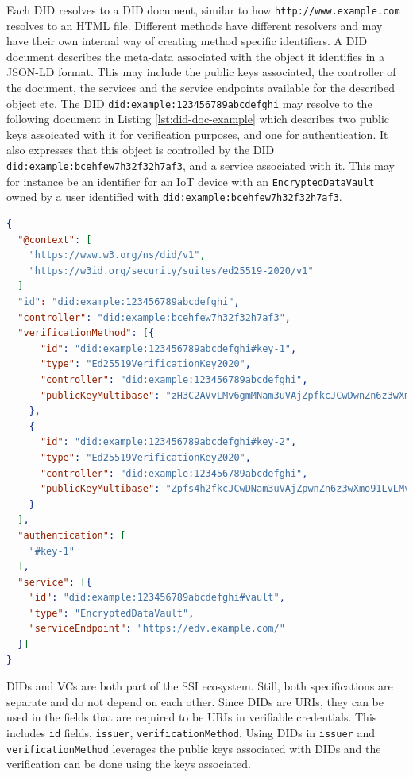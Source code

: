 Each \acrshort{DID} resolves to a \acrshort{DID} document, similar to how \lstinline{http://www.example.com} resolves to an HTML file. Different methods have different resolvers and may have their own internal way of creating method specific identifiers. A \acrshort{DID} document describes the meta-data associated with the object it identifies in a \acrshort{JSON-LD} format. This may include the public keys associated, the controller of the document, the services and the service endpoints available for the described object etc. The \acrshort{DID} \lstinline{did:example:123456789abcdefghi} may resolve to the following document in Listing \ref{lst:did-doc-example} which describes two public keys assoicated with it for verification purposes, and one for authentication. It also expresses that this object is controlled by the \acrshort{DID} \lstinline{did:example:bcehfew7h32f32h7af3}, and a service associated with it. This may for instance be an identifier for an \acrshort{IoT} device with an \lstinline{EncryptedDataVault} owned by a user identified with \lstinline{did:example:bcehfew7h32f32h7af3}.

\begin{lstlisting}[language=json, label={lst:did-doc-example}, caption={Example\acrlong{DID} document \parencite{reed_sporny_longley_allen_grant_sabadello_2021}}]
{
  "@context": [
    "https://www.w3.org/ns/did/v1",
    "https://w3id.org/security/suites/ed25519-2020/v1"
  ]
  "id": "did:example:123456789abcdefghi",
  "controller": "did:example:bcehfew7h32f32h7af3",
  "verificationMethod": [{
      "id": "did:example:123456789abcdefghi#key-1",
      "type": "Ed25519VerificationKey2020", 
      "controller": "did:example:123456789abcdefghi",
      "publicKeyMultibase": "zH3C2AVvLMv6gmMNam3uVAjZpfkcJCwDwnZn6z3wXmqPV"
    }, 
    {
      "id": "did:example:123456789abcdefghi#key-2",
      "type": "Ed25519VerificationKey2020", 
      "controller": "did:example:123456789abcdefghi",
      "publicKeyMultibase": "Zpfs4h2fkcJCwDNam3uVAjZpwnZn6z3wXmo91LvLMv6A"
    }
  ],
  "authentication": [
    "#key-1"
  ],
  "service": [{
    "id": "did:example:123456789abcdefghi#vault",
    "type": "EncryptedDataVault",
    "serviceEndpoint": "https://edv.example.com/"
  }]
}
\end{lstlisting}

\acrshort{DID}s and \acrshort{VC}s are both part of the \acrfull{SSI} ecosystem. Still, both specifications are separate and do not depend on each other. Since \acrshort{DID}s are \acrshort{URI}s, they can be used in the fields that are required to be \acrshort{URI}s in verifiable credentials. This includes \lstinline{id} fields, \lstinline{issuer}, \lstinline{verificationMethod}. Using \acrshort{DID}s in \lstinline{issuer} and \lstinline{verificationMethod} leverages the public keys associated with \acrshort{DID}s and the verification can be done using the keys associated.

